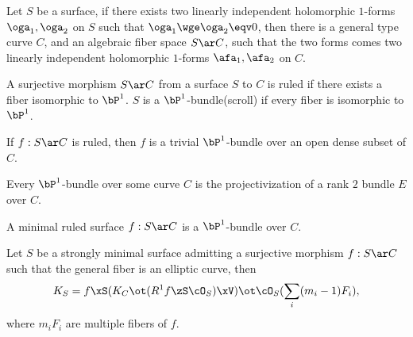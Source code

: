 \documentclass[a4paper, twoside]{article}
\begin{document}
\begin{thm}
	Let $S$ be a surface, if there exists two linearly independent holomorphic $1$-forms $\oga_{1},\oga_{2}$ on $S$ such that $\oga_{1}\wge\oga_{2}\eqv0$, then there is a general type curve $C$, and an algebraic fiber space $S\ar C$, such that the two forms comes two linearly independent holomorphic $1$-forms $\afa_{1},\afa_{2}$ on $C$.
\end{thm}



\begin{dfn}
	A surjective morphism $S\ar C$ from a surface $S$ to $C$ is ruled if there exists a fiber isomorphic to $\bP^{1}$. $S$ is a $\bP^{1}$-bundle(scroll) if every fiber is isomorphic to $\bP^{1}$.
\end{dfn}

\begin{thm}
	If $f:S\ar C$ is ruled, then $f$ is a trivial $\bP^{1}$-bundle over an open dense subset of $C$.
\end{thm}

\begin{thm}[Theorem~4.6]
	Every $\bP^{1}$-bundle over some curve $C$ is the projectivization of a rank $2$ bundle $E$ over $C$.
\end{thm}

\begin{thm}[Proposition~4.7]
	A minimal ruled surface $f:S\ar C$ is a $\bP^{1}$-bundle over $C$.
\end{thm}



\begin{thm}[Theorem~9.18]
	Let $S$ be a strongly minimal surface admitting a surjective morphism $f:S\ar C$ such that the general fiber is an elliptic curve, then
	\[
		K_{S}=f\xS(K_{C}\ot(R^{1}f\zS\cO_{S})\xV)\ot\cO_{S}(\sum_{i}(m_{i}-1)F_{i}),
	\]
	where $m_{i}F_{i}$ are multiple fibers of $f$.
\end{thm}







\end{document}
